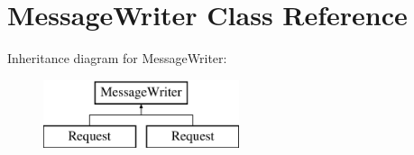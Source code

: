 \hypertarget{class_message_writer}{}\section{Message\+Writer Class Reference}
\label{class_message_writer}
Inheritance diagram for Message\+Writer\+:\begin{figure}[H]
\begin{center}
\leavevmode
\includegraphics[height=2.000000cm]{class_message_writer}
\end{center}
\end{figure}
